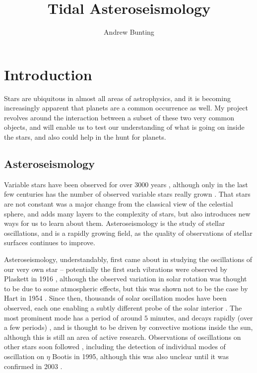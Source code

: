 \documentclass[11pt]{amsart}
\title{Tidal Asteroseismology}
\author{Andrew Bunting}
\begin{document}
\maketitle

\section{Introduction}

Stars are ubiquitous in almost all areas of astrophysics, and it is becoming increasingly apparent that planets are a common occurrence as well.  My project revolves around the interaction between a subset of these two very common objects, and will enable us to test our understanding of what is going on inside the stars, and also could help in the hunt for planets.

\subsection{Asteroseismology}

Variable stars have been observed for over $3000$ years \cite{Jetsu2015}, although only in the last few centuries has the number of observed variable stars really grown \cite{Hoffleit1997}.  That stars are not constant was a major change from the classical view of the celestial sphere, and adds many layers to the complexity of stars, but also introduces new ways for us to learn about them.  Asteroseismology is the study of stellar oscillations, and is a rapidly growing field, as the quality of observations of stellar surfaces continues to improve.

Asteroseismology, understandably, first came about in studying the oscillations of our very own star -- potentially the first such vibrations were observed by Plaskett in 1916 \cite{Plaskett1916}, although the  observed variation in solar rotation was thought to be due to some atmospheric effects, but this was shown not to be the case by Hart in 1954 \cite{Hart1954}.  Since then, thousands of solar oscillation modes have been observed, each one enabling a subtly different probe of the solar interior \cite{DiMauro2017}.  The most prominent mode has a period of around $5$ minutes, and decays rapidly (over a few periods) \cite{Ulrich1970},  and is thought to be driven by convective motions inside the sun, although this is still an area of active research.  Observations of oscillations on other stars soon followed \cite{Brown1991}, including the detection of individual modes of oscillation on $\eta$ Bootis in 1995, although this was also unclear until it was confirmed in 2003 \cite{Kjeldsen2003}.
\end{document}
